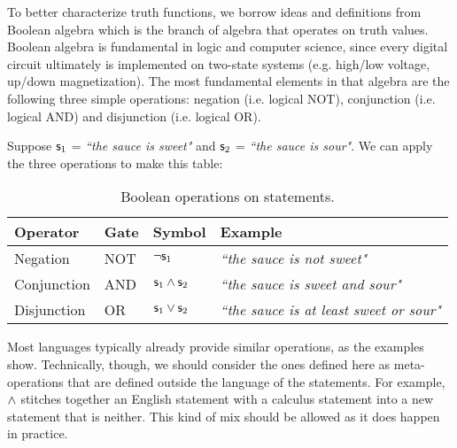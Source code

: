 \documentclass[11pt,letterpaper,fleqn]{memoir} %
\begin{document}
To better characterize truth functions, we borrow ideas and definitions from Boolean algebra which is the branch of algebra that operates on truth values. Boolean algebra is fundamental in logic and computer science, since every digital circuit ultimately is implemented on two-state systems (e.g. high/low voltage, up/down magnetization).  The most fundamental elements in that algebra are the following three simple operations: negation (i.e. logical NOT), conjunction (i.e. logical AND) and disjunction (i.e. logical OR).

Suppose $\mathsf{s}_1$ = \emph{``the sauce is sweet"} and $\mathsf{s}_2$ = \emph{``the sauce is sour"}. We can apply the three operations to make this table:

\begin{table}[h]
	\centering
	\begin{tabular}{p{} p{} p{} p{}}
		Operator & Gate & Symbol & Example \\ 
		\hline 
		Negation & NOT & $\neg \mathsf{s}_1$ &  \emph{``the sauce is not sweet"} \\ 
		Conjunction & AND & $\mathsf{s}_1 \wedge \mathsf{s}_2$ & \emph{``the sauce is sweet and sour"} \\ 
		Disjunction & OR & $\mathsf{s}_1 \vee \mathsf{s}_2$ & \emph{``the sauce is at least sweet or sour"}
	\end{tabular} 
	\caption{Boolean operations on statements.}
\end{table}

Most languages typically already provide similar operations, as the examples show. Technically, though, we should consider the ones defined here as meta-operations that are defined outside the language of the statements. For example, $\wedge$ stitches together an English statement with a calculus statement into a new statement that is neither. This kind of mix should be allowed as it does happen in practice.
\end{document}
